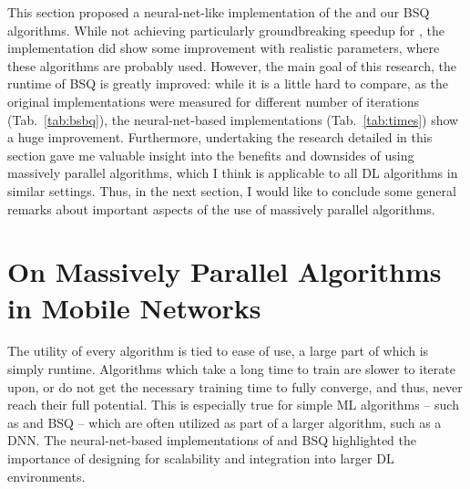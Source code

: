 			This section proposed a neural-net-like implementation of the \kmeans{} and our \ac{BSQ} algorithms.
			While not achieving particularly groundbreaking speedup for \kmeans{}, the implementation did show some improvement with realistic parameters, where these algorithms are probably used.
			However, the main goal of this research, the runtime of \ac{BSQ} is greatly improved: while it is a little hard to compare, as the original implementations were measured for different number of iterations (Tab.~\ref{tab:bsbq}), the neural-net-based implementations (Tab.~\ref{tab:times}) show a huge improvement.
			Furthermore, undertaking the research detailed in this section gave me valuable insight into the benefits and downsides of using massively parallel algorithms, which I think is applicable to all \ac{DL} algorithms in similar settings.
			Thus, in the next section, I would like to conclude some general remarks about important aspects of the use of massively parallel algorithms. 
		
	\section{On Massively Parallel Algorithms in Mobile Networks}
		\label{cha:quantization:sec:on_parallelization}	

		The utility of every algorithm is tied to ease of use, a large part of which is simply runtime.
		Algorithms which take a long time to train are slower to iterate upon, or do not get the necessary training time to fully converge, and thus, never reach their full potential.
		This is especially true for simple \ac{ML} algorithms -- such as \kmeans{} and \ac{BSQ} -- which are often utilized as part of a larger algorithm, such as a \ac{DNN}.
		The neural-net-based implementations of \kmeans{} and \ac{BSQ} highlighted the importance of designing for scalability and integration into larger \ac{DL} environments.
		
